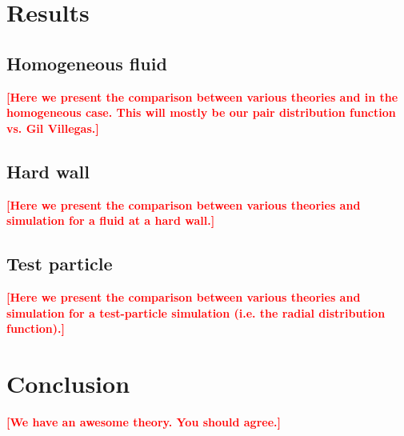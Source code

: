 \documentclass[letterpaper,twocolumn,amsmath,amssymb,pre,aps,10pt]{revtex4-1}
\newcommand\fixme[1]{\textcolor{red}{\textbf{[#1]}}}
\begin{document}
\section{Results}

\subsection{Homogeneous fluid}

\fixme{Here we present the comparison between various theories and in
  the homogeneous case.  This will mostly be our pair distribution
  function vs. Gil Villegas.}

\subsection{Hard wall}

\fixme{Here we present the comparison between various theories and
  simulation for a fluid at a hard wall.}

\subsection{Test particle}

\fixme{Here we present the comparison between various theories and
  simulation for a test-particle simulation (i.e. the radial
  distribution function).}

\section{Conclusion}

\fixme{We have an awesome theory. You should agree.}

\end{document}
